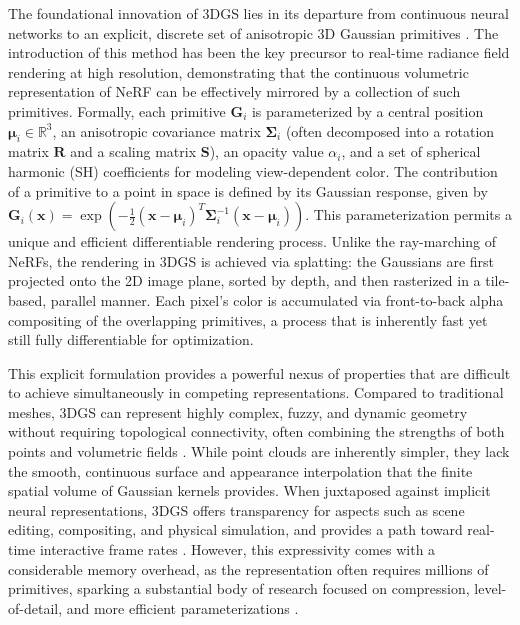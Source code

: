\documentclass[11pt,a4paper]{article}
\begin{document}
The foundational innovation of 3DGS lies in its departure from continuous neural networks to an explicit, discrete set of anisotropic 3D Gaussian primitives \cite{arxiv:2308.04079v1}. The introduction of this method has been the key precursor to real-time radiance field rendering at high resolution, demonstrating that the continuous volumetric representation of NeRF can be effectively mirrored by a collection of such primitives. Formally, each primitive \( \mathbf{G}_i \) is parameterized by a central position \( \boldsymbol{\mu}_i \in \mathbb{R}^3 \), an anisotropic covariance matrix \( \boldsymbol{\Sigma}_i \) (often decomposed into a rotation matrix \( \mathbf{R} \) and a scaling matrix \( \mathbf{S} \)), an opacity value \( \alpha_i \), and a set of spherical harmonic (SH) coefficients for modeling view-dependent color. The contribution of a primitive to a point in space is defined by its Gaussian response, given by \( \mathbf{G}_i(\mathbf{x}) = \exp\left(-\frac{1}{2}(\mathbf{x} - \boldsymbol{\mu}_i)^T \boldsymbol{\Sigma}_i^{-1} (\mathbf{x} - \boldsymbol{\mu}_i)\right) \). This parameterization permits a unique and efficient differentiable rendering process. Unlike the ray-marching of NeRFs, the rendering in 3DGS is achieved via splatting: the Gaussians are first projected onto the 2D image plane, sorted by depth, and then rasterized in a tile-based, parallel manner. Each pixel's color is accumulated via front-to-back alpha compositing of the overlapping primitives, a process that is inherently fast yet still fully differentiable for optimization.

This explicit formulation provides a powerful nexus of properties that are difficult to achieve simultaneously in competing representations. Compared to traditional meshes, 3DGS can represent highly complex, fuzzy, and dynamic geometry without requiring topological connectivity, often combining the strengths of both points and volumetric fields \cite{arxiv:2403.11134v2}. While point clouds are inherently simpler, they lack the smooth, continuous surface and appearance interpolation that the finite spatial volume of Gaussian kernels provides. When juxtaposed against implicit neural representations, 3DGS offers transparency for aspects such as scene editing, compositing, and physical simulation, and provides a path toward real-time interactive frame rates \cite{arxiv:2510.18101v1}. However, this expressivity comes with a considerable memory overhead, as the representation often requires millions of primitives, sparking a substantial body of research focused on compression, level-of-detail, and more efficient parameterizations \cite{arxiv:2406.17074v1,arxiv:2406.12080v1}.
\end{document}
